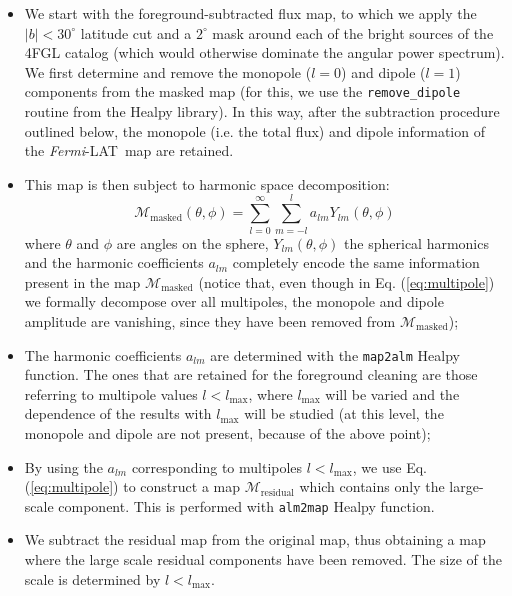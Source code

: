 \documentclass[a4paper,11pt]{article}
\newcommand{\fermi}{\textsl{Fermi}-LAT\ }
\begin{document}
\begin{itemize}
\item We start with the foreground-subtracted flux map, to which we apply the $|b|<30^\circ$ latitude cut and a $2^\circ$ mask around each of the bright sources of the 4FGL catalog (which would otherwise dominate the angular power spectrum).
We first determine and remove the monopole ($l=0$) and dipole ($l=1$) components from the masked map (for this, we use the \verb|remove_dipole| routine from the Healpy library). In this way, after the subtraction procedure outlined below, the monopole (i.e. the total flux) and dipole information of the \fermi map are retained.

\item  This map is then subject to harmonic space decomposition:
\begin{equation}
\mathcal{M}_\textrm{masked}(\theta,\phi) = \sum_{l=0}^{\infty} \sum_{m=-l}^{l} a_{lm} Y_{lm}(\theta,\phi)
\label{eq:multipole}
\end{equation}
where $\theta$ and $\phi$ are angles on the sphere, $Y_{lm}(\theta,\phi)$ the spherical harmonics and the harmonic coefficients $a_{lm}$ completely encode the same information present in the map $\mathcal{M}_\textrm{masked}$  (notice that, even though in Eq. (\ref{eq:multipole}) we formally decompose over all multipoles, the monopole and dipole amplitude are vanishing, since they have been removed from  $\mathcal{M}_\textrm{masked}$);

\item The harmonic coefficients $a_{lm}$ are determined with the \verb|map2alm| Healpy function. The ones that are retained for the foreground cleaning are those referring to multipole values $l < l_\textrm{max}$, where $l_\textrm{max}$ will be varied and the dependence of the results with $l_\textrm{max}$ will be studied (at this level, the monopole and dipole are not present, because of the above point);

\item By using the $a_{lm}$ corresponding to multipoles $l < l_\textrm{max}$, we use Eq. (\ref{eq:multipole}) to construct a map $\mathcal{M}_\textrm{residual}$ which contains only the large-scale component. This is performed with \verb|alm2map| Healpy function.

\item We subtract the residual map from the original map, thus obtaining a map where the large scale residual components have been removed. The size of the scale is determined by $l < l_\textrm{max}$.

\end{itemize}
\end{document}
